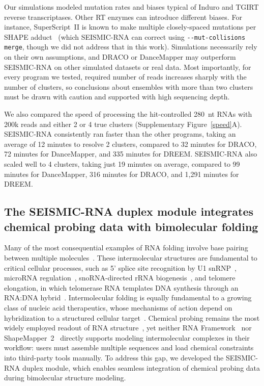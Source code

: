 \documentclass[unnumsec,webpdf,contemporary,large]{oup-authoring-template}%
\theoremstyle{thmstyleone}%
\theoremstyle{thmstyletwo}%
\theoremstyle{thmstylethree}%
\begin{document}
Our simulations modeled mutation rates and biases typical of Induro and TGIRT reverse transcriptases.
Other RT enzymes can introduce different biases.
For instance, SuperScript~II is known to make multiple closely-spaced mutations per SHAPE adduct~\cite{Busan2018} (which SEISMIC-RNA can correct using \verb|--mut-collisions merge|, though we did not address that in this work).
Simulations necessarily rely on their own assumptions, and DRACO or DanceMapper may outperform SEISMIC-RNA on other simulated datasets or real data.
Most importantly, for every program we tested, required number of reads increases sharply with the number of clusters, so conclusions about ensembles with more than two clusters must be drawn with caution and supported with high sequencing depth.

We also compared the speed of processing the hit-controlled 280~nt RNAs with 200k reads and either 2 or 4 true clusters (Supplementary Figure~\ref{speed}A).
SEISMIC-RNA consistently ran faster than the other programs, taking an average of 12 minutes to resolve 2 clusters, compared to 32 minutes for DRACO, 72 minutes for DanceMapper, and 335 minutes for DREEM.
SEISMIC-RNA also scaled well to 4 clusters, taking just 19 minutes on average, compared to 99 minutes for DanceMapper, 316 minutes for DRACO, and 1,291 minutes for DREEM.


\subsection{The SEISMIC-RNA duplex module integrates chemical probing data with bimolecular folding}

Many of the most consequential examples of RNA folding involve base pairing between multiple molecules~\cite{Cech2014,Guil2015}. These intermolecular structures are fundamental to critical cellular processes, such as 5' splice site recognition by U1 snRNP~\cite{Lerner1980,Zhuang1986}, microRNA regulation~\cite{Lewis2005}, snoRNA-directed rRNA biogenesis~\cite{KissLaszlo1996,Ganot1997}, and telomere elongation, in which telomerase RNA templates DNA synthesis through an RNA:DNA hybrid~\cite{Greider1989,Feng1995}. Intermolecular folding is equally fundamental to a growing class of nucleic acid therapeutics, whose mechanisms of action depend on hybridization to a structured cellular target~\cite{Crooke2021}. Chemical probing remains the most widely employed readout of RNA structure~\cite{Kubota2015,Spitale2023}, yet neither RNA Framework~\cite{Incarnato2018} nor ShapeMapper~2~\cite{Busan2018} directly supports modeling intermolecular complexes in their workflow: users must assemble multiple sequences and load chemical constraints into third-party tools manually. To address this gap, we developed the SEISMIC-RNA duplex module, which enables seamless integration of chemical probing data during bimolecular structure modeling.
\end{document}
